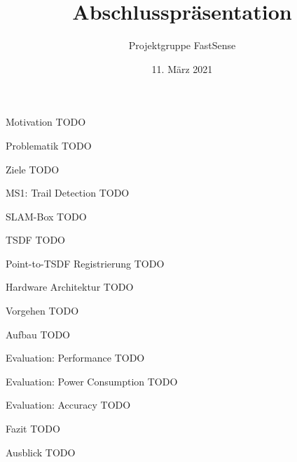 \documentclass{beamer}
\title{Abschlusspräsentation}
\author{Projektgruppe FastSense}
\date{11. März 2021}
\begin{document}
{
\begin{frame}
\titlepage
\end{frame}}

\begin{frame}{Motivation}
TODO
\end{frame}

\begin{frame}{Problematik}
TODO
\end{frame}

\begin{frame}{Ziele}
TODO
\end{frame}

\begin{frame}{MS1: Trail Detection}
TODO    
\end{frame}

\begin{frame}{SLAM-Box}
TODO
\end{frame}

\begin{frame}{TSDF}
TODO    
\end{frame}

\begin{frame}{Point-to-TSDF Registrierung}
TODO
\end{frame}

\begin{frame} {Hardware Architektur}
TODO
\end{frame}

\begin{frame}{Vorgehen}
TODO    
\end{frame}

\begin{frame}{Aufbau}
TODO    
\end{frame}

\begin{frame}{Evaluation: Performance}
TODO
\end{frame}

\begin{frame}{Evaluation: Power Consumption}
TODO
\end{frame}

\begin{frame}{Evaluation: Accuracy}
TODO
\end{frame}

\begin{frame}{Fazit}
TODO    
\end{frame}

\begin{frame}{Ausblick}
TODO
\end{frame}
\end{document}
